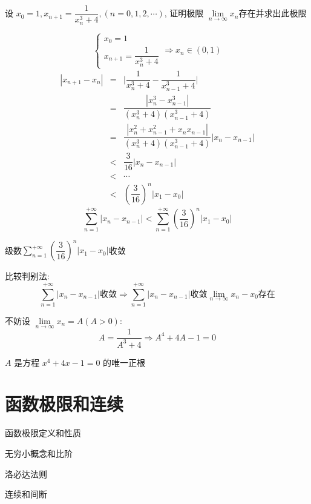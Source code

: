 \begin{proposition}
	设 $x_{0}=1,x_{n+1}=\dfrac{1}{x_{n}^3+4},(n=0,1,2,\cdots)$, 证明极限 $\lim\limits_{n\rightarrow\infty}x_{n}$存在并求出此极限
\end{proposition}
\begin{solution}
	
	$$\begin{cases}
		x_{0} = 1\\
		x_{n+1} = \dfrac{1}{x_{n}^{3}+4}
	\end{cases} \Rightarrow x_{n}\in(0,1)$$
	\begin{eqnarray*}
		|x_{n+1}-x_{n}| & = & \big|\dfrac{1}{x_{n}^3+4}-\dfrac{1}{x_{n-1}^3+4}\big| \\
						& = & \dfrac{|x_{n}^{3}-x_{n-1}^{3}|}{(x_{n}^3+4)(x_{n-1}^3+4)} \\
						& = & \dfrac{|x_{n}^{2}+x_{n-1}^{2}+x_{n}x_{n-1}|}{(x_{n}^3+4)(x_{n-1}^3+4)}|x_{n}-x_{n-1}| \\
						& < & \dfrac{3}{16}|x_{n}-x_{n-1}|\\
						& < & \cdots\\
						& < & (\dfrac{3}{16})^{n}|x_{1}-x_{0}|
	\end{eqnarray*}
	$$\sum\limits_{n=1}^{+\infty}|x_{n}-x_{n-1}| < \sum\limits_{n=1}^{+\infty} (\dfrac{3}{16})^{n}|x_{1}-x_{0}|$$
	
	级数$\sum\limits_{n=1}^{+\infty}(\dfrac{3}{16})^{n}|x_{1}-x_{0}|$收敛
	
	比较判别法: 
	$$\sum\limits_{n=1}^{+\infty}|x_{n}-x_{n-1}|\text{收敛}\Rightarrow \sum\limits_{n=1}^{+\infty}|x_{n}-x_{n-1}|\text{收敛}
	\lim\limits_{n\rightarrow\infty}x_{n}-x_{0}\text{存在}$$
	
	不妨设 $\lim\limits_{n\rightarrow\infty}x_{n}=A(A>0)$: 
	$$A=\dfrac{1}{A^3+4}\Rightarrow A^4+4A-1=0$$
	
	$A$ 是方程 $x^4+4x-1=0$ 的唯一正根
\end{solution}

\chapter{函数极限和连续}
\begin{introduction}
	\item 函数极限定义和性质
	\item 无穷小概念和比阶
	\item 洛必达法则
	\item 连续和间断
\end{introduction}

